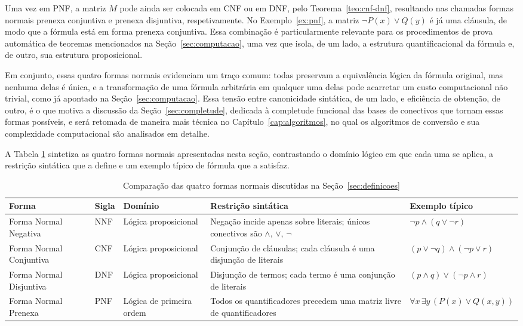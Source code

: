 \documentclass[12pt,a4paper,oneside]{report}
\theoremstyle{tituloplain}
\theoremstyle{titulodef}
\begin{document}
Uma vez em PNF, a matriz $M$ pode ainda ser colocada em CNF ou em DNF, pelo Teorema~\ref{teo:cnf-dnf}, resultando nas chamadas formas normais prenexa conjuntiva e prenexa disjuntiva, respetivamente. No Exemplo~\ref{ex:pnf}, a matriz $\neg P(x)\vee Q(y)$ é já uma cláusula, de modo que a fórmula está em forma prenexa conjuntiva. Essa combinação é particularmente relevante para os procedimentos de prova automática de teoremas mencionados na Seção~\ref{sec:computacao}, uma vez que isola, de um lado, a estrutura quantificacional da fórmula e, de outro, sua estrutura proposicional.

Em conjunto, essas quatro formas normais evidenciam um traço comum: todas preservam a equivalência lógica da fórmula original, mas nenhuma delas é única, e a transformação de uma fórmula arbitrária em qualquer uma delas pode acarretar um custo computacional não trivial, como já apontado na Seção~\ref{sec:computacao}. Essa tensão entre canonicidade sintática, de um lado, e eficiência de obtenção, de outro, é o que motiva a discussão da Seção~\ref{sec:completude}, dedicada à completude funcional das bases de conectivos que tornam essas formas possíveis, e será retomada de maneira mais técnica no Capítulo~\ref{cap:algoritmos}, no qual os algoritmos de conversão e sua complexidade computacional são analisados em detalhe.

A Tabela \ref{tab:formas-normais} sintetiza as quatro formas normais apresentadas nesta seção, contrastando o domínio lógico em que cada uma se aplica, a restrição sintática que a define e um exemplo típico de fórmula que a satisfaz.

\begin{table}[htbp]
\centering
\caption{Comparação das quatro formas normais discutidas na Seção~\ref{sec:definicoes}}
\label{tab:formas-normais}
\begin{tabular}{@{}p{2.6cm}p{1.2cm}p{2.4cm}p{4.2cm}p{3.6cm}@{}}
\toprule
\textbf{Forma} & \textbf{Sigla} & \textbf{Domínio} & \textbf{Restrição sintática} & \textbf{Exemplo típico} \\
\midrule
Forma Normal Negativa & NNF & Lógica proposicional & Negação incide apenas sobre literais; únicos conectivos são $\wedge$, $\vee$, $\neg$ & $\neg p \wedge (q \vee \neg r)$ \\
\addlinespace
Forma Normal Conjuntiva & CNF & Lógica proposicional & Conjunção de cláusulas; cada cláusula é uma disjunção de literais & $(p \vee \neg q) \wedge (\neg p \vee r)$ \\
\addlinespace
Forma Normal Disjuntiva & DNF & Lógica proposicional & Disjunção de termos; cada termo é uma conjunção de literais & $(p \wedge q) \vee (\neg p \wedge r)$ \\
\addlinespace
Forma Normal Prenexa & PNF & Lógica de primeira ordem & Todos os quantificadores precedem uma matriz livre de quantificadores & $\forall x\, \exists y\, (P(x) \vee Q(x,y))$ \\
\bottomrule
\end{tabular}
\end{table}
\end{document}
